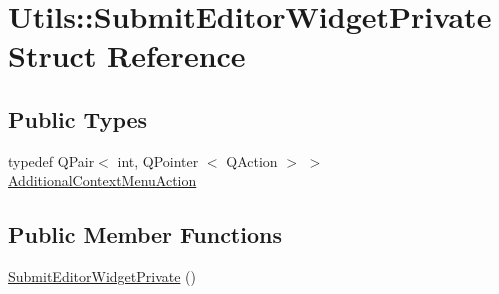\hypertarget{struct_utils_1_1_submit_editor_widget_private}{\section{\-Utils\-:\-:\-Submit\-Editor\-Widget\-Private \-Struct \-Reference}
\label{struct_utils_1_1_submit_editor_widget_private}
}
\subsection*{\-Public \-Types}
\begin{DoxyCompactItemize}
\item 
typedef \-Q\-Pair$<$ int, \-Q\-Pointer\*
$<$ \-Q\-Action $>$ $>$ \hyperlink{struct_utils_1_1_submit_editor_widget_private_adb3c92b95990f75654e9c25101be736d}{\-Additional\-Context\-Menu\-Action}
\end{DoxyCompactItemize}
\subsection*{\-Public \-Member \-Functions}
\begin{DoxyCompactItemize}
\item 
\hyperlink{struct_utils_1_1_submit_editor_widget_private_a4b87ebfe03cbd5619cf5ba30997c12da}{\-Submit\-Editor\-Widget\-Private} ()
\end{DoxyCompactItemize}
